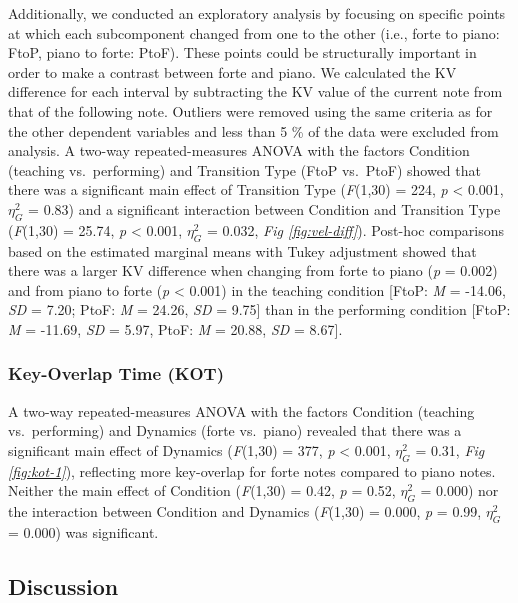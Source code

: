 \documentclass[
  english,
  man,floatsintext]{apa6}
\begin{document}
Additionally, we conducted an exploratory analysis by focusing on specific points at which each subcomponent changed from one to the other (i.e., forte to piano: FtoP, piano to forte: PtoF). These points could be structurally important in order to make a contrast between forte and piano. We calculated the KV difference for each interval by subtracting the KV value of the current note from that of the following note. Outliers were removed using the same criteria as for the other dependent variables and less than 5 \% of the data were excluded from analysis. A two-way repeated-measures ANOVA with the factors Condition (teaching vs.~performing) and Transition Type (FtoP vs.~PtoF) showed that there was a significant main effect of Transition Type (\emph{F}(1,30) = 224, \emph{p} \textless{} 0.001, \(\eta_G^2\) = 0.83) and a significant interaction between Condition and Transition Type (\emph{F}(1,30) = 25.74, \emph{p} \textless{} 0.001, \(\eta_G^2\) = 0.032, \emph{Fig \ref{fig:vel-diff}}). Post-hoc comparisons based on the estimated marginal means with Tukey adjustment showed that there was a larger KV difference when changing from forte to piano (\emph{p} = 0.002) and from piano to forte (\emph{p} \textless{} 0.001) in the teaching condition {[}FtoP: \emph{M} = -14.06, \emph{SD} = 7.20; PtoF: \emph{M} = 24.26, \emph{SD} = 9.75{]} than in the performing condition {[}FtoP: \emph{M} = -11.69, \emph{SD} = 5.97, PtoF: \emph{M} = 20.88, \emph{SD} = 8.67{]}.

\hypertarget{key-overlap-time-kot}{%
\subsubsection{Key-Overlap Time (KOT)}\label{key-overlap-time-kot}}

A two-way repeated-measures ANOVA with the factors Condition (teaching vs.~performing) and Dynamics (forte vs.~piano) revealed that there was a significant main effect of Dynamics (\emph{F}(1,30) = 377, \emph{p} \textless{} 0.001, \(\eta_G^2\) = 0.31, \emph{Fig \ref{fig:kot-1}}), reflecting more key-overlap for forte notes compared to piano notes. Neither the main effect of Condition (\emph{F}(1,30) = 0.42, \emph{p} = 0.52, \(\eta_G^2\) = 0.000) nor the interaction between Condition and Dynamics (\emph{F}(1,30) = 0.000, \emph{p} = 0.99, \(\eta_G^2\) = 0.000) was significant.

\hypertarget{discussion}{%
\subsection{Discussion}\label{discussion}}
\end{document}
